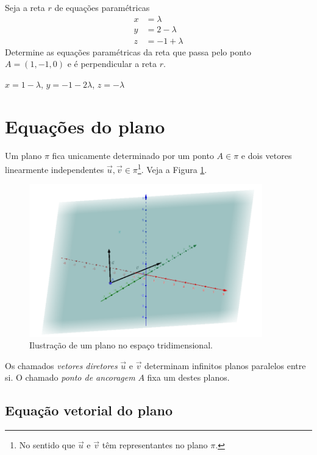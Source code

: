 \begin{exer}
  Seja a reta $r$ de equações paramétricas
  \begin{align}
    x &= \lambda\\
    y &= 2-\lambda\\
    z &= -1+\lambda
  \end{align}
  Determine as equações paramétricas da reta que passa pelo ponto $A=(1,-1,0)$ e é perpendicular a reta $r$.
\end{exer}
\begin{resp}
  $x=1-\lambda$, $y=-1-2\lambda$, $z=-\lambda$
\end{resp}

\section{Equações do plano}\label{cap_estudo_sec_eqsplano}
\badgeRevisar

Um plano $\pi$ fica unicamente determinado por um ponto $A\in \pi$ e dois vetores linearmente independentes $\vec{u},\vec{v}\in \pi$\footnote{No sentido que $\vec{u}$ e $\vec{v}$ têm representantes no plano $\pi$.}. Veja a Figura \ref{fig:ep_plano}.

\begin{figure}[H]
  \centering
  \includegraphics[width=0.9\textwidth]{cap_estudo/dados/fig_ep_plano/fig}
  \caption{Ilustração de um plano no espaço tridimensional.}
  \label{fig:ep_plano}
\end{figure}

Os chamados \emph{vetores diretores} $\vec{u}$ e $\vec{v}$ determinam infinitos planos paralelos entre si. O chamado \emph{ponto de ancoragem} $A$ fixa um destes planos.

\subsection{Equação vetorial do plano}

